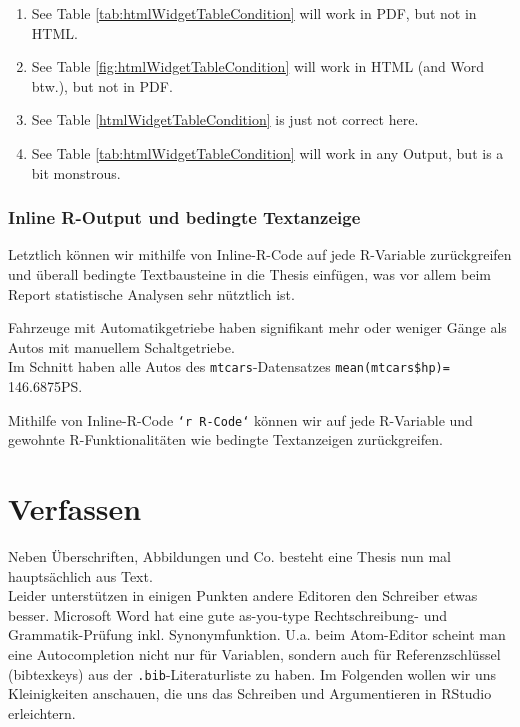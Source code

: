 \documentclass[]{book}
\makeatletter
\newenvironment{Shaded}{\begin{snugshade}}{\end{snugshade}}
\newcommand{\BaseNTok}[1]{\textcolor[rgb]{0.00,0.00,0.81}{{#1}}}
\newcommand{\NormalTok}[1]{{#1}}
\providecommand{\tightlist}{%
  \setlength{\itemsep}{0pt}\setlength{\parskip}{0pt}}
\newenvironment{kframe}{%
\medskip{}
\setlength{\fboxsep}{.8em}
 \def\at@end@of@kframe{}%
 \ifinner\ifhmode%
  \def\at@end@of@kframe{\end{minipage}}%
  \begin{minipage}{\columnwidth}%
 \fi\fi%
 \def\FrameCommand##1{\hskip\@totalleftmargin \hskip-\fboxsep
 \colorbox{shadecolor}{##1}\hskip-\fboxsep
     \hskip-\linewidth \hskip-\@totalleftmargin \hskip\columnwidth}%
 \MakeFramed {\advance\hsize-\width
   \@totalleftmargin\z@ \linewidth\hsize
   \@setminipage}}%
 {\par\unskip\endMakeFramed%
 \at@end@of@kframe}
\renewenvironment{Shaded}{\begin{kframe}}{\end{kframe}}
\theoremstyle{definition}
\theoremstyle{definition}
\theoremstyle{remark}
\let\BeginKnitrBlock\begin \let\EndKnitrBlock\end
\makeatother
\begin{document}
\begin{enumerate}
\def\labelenumi{\arabic{enumi}.}
\tightlist
\item
  See Table \ref{tab:htmlWidgetTableCondition} will work in PDF, but not
  in HTML.
\item
  See Table \ref{fig:htmlWidgetTableCondition} will work in HTML (and
  Word btw.), but not in PDF.
\item
  See Table \ref{htmlWidgetTableCondition} is just not correct here.
\item
  See Table \ref{tab:htmlWidgetTableCondition} will work in any Output,
  but is a bit monstrous.
\end{enumerate}

\subsection{Inline R-Output und bedingte
Textanzeige}\label{inline-r-output-und-bedingte-textanzeige}

Letztlich können wir mithilfe von Inline-R-Code auf jede R-Variable
zurückgreifen und überall bedingte Textbausteine in die Thesis einfügen,
was vor allem beim Report statistische Analysen sehr nütztlich ist.

\begin{Shaded}
\end{Shaded}

Fahrzeuge mit Automatikgetriebe haben signifikant mehr oder weniger
Gänge als Autos mit manuellem Schaltgetriebe.\\
Im Schnitt haben alle Autos des \texttt{mtcars}-Datensatzes
\texttt{mean(mtcars\$hp)=} 146.6875PS.

\BeginKnitrBlock{rmdimportant}
Mithilfe von Inline-R-Code \texttt{`r\ R-Code`} können wir auf jede
R-Variable und gewohnte R-Funktionalitäten wie bedingte Textanzeigen
zurückgreifen.
\EndKnitrBlock{rmdimportant}

\chapter{Verfassen}\label{verfassen}

Neben Überschriften, Abbildungen und Co. besteht eine Thesis nun mal
hauptsächlich aus Text.\\
Leider unterstützen in einigen Punkten andere Editoren den Schreiber
etwas besser. Microsoft Word hat eine gute as-you-type Rechtschreibung-
und Grammatik-Prüfung inkl. Synonymfunktion. U.a. beim Atom-Editor
scheint man eine Autocompletion nicht nur für Variablen, sondern auch
für Referenzschlüssel (bibtexkeys) aus der \texttt{.bib}-Literaturliste
zu haben. Im Folgenden wollen wir uns Kleinigkeiten anschauen, die uns
das Schreiben und Argumentieren in RStudio erleichtern.
\end{document}
